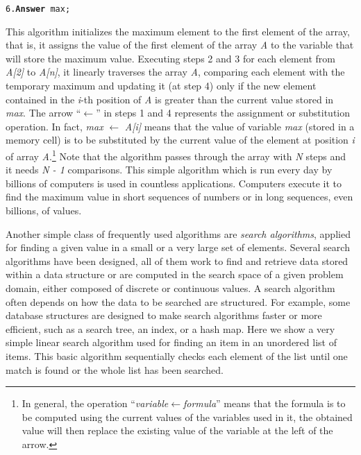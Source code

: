 {{{\begin{algorithm}[!h]
\texttt{6.\qquad     \textbf{Answer }max;}

\end{algorithm}

This algorithm initializes the maximum element to the first element of the array, that is, it assigns the value of the first element of the array \textit{A} to the variable that will store the maximum value. Executing steps 2 and 3 for each element from \textit{A[2]} to \textit{A[n]}, it linearly traverses the array \textit{A}, comparing each element with the temporary maximum and updating it (at step 4) only if the new element contained in the \textit{i}-th position of \textit{A} is greater than the current value stored in \textit{max}. The arrow ``\textbf{$\leftarrow$}'' in steps 1 and 4 represents the assignment or substitution operation. In fact, \textit{max} \textbf{$\leftarrow$} \textit{A[i]} means that the value of variable \textit{max} (stored in a memory cell) is to be substituted by the current value of the element at position \textit{i} of array \textit{A}.\footnote{In general, the operation ``\textit{variable}\textbf{$\leftarrow$}\textit{formula}'' means that the formula is to be computed using the current values of the variables used in it, the obtained value will then replace the existing value of the variable at the left of the arrow.} Note that the algorithm passes through the array with \textit{N} steps and it needs \textit{N - 1} comparisons. This simple algorithm which is run every day by billions of computers is used in countless applications. Computers execute it to find the maximum value in short sequences of numbers or in long sequences, even billions, of values.

Another simple class of frequently used algorithms are \textit{search algorithms}, applied for finding a given value in a small or a very large set of elements. Several search algorithms have been designed, all of them work to find and retrieve data stored within a data structure or are computed in the search space of a given problem domain, either composed of discrete or continuous values. A search algorithm often depends on how the data to be searched are structured. For example, some database structures are designed to make search algorithms faster or more efficient, such as a search tree, an index, or a hash map. Here we show a very simple linear search algorithm used for finding an item in an unordered list of items. This basic algorithm sequentially checks each element of the list until one match is found or the whole list has been searched.

}}}
